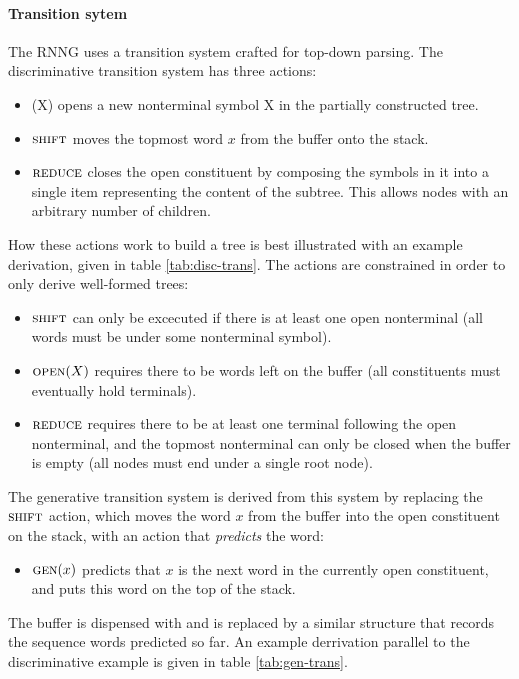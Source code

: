 \paragraph{Transition sytem}
The RNNG uses a transition system crafted for top-down parsing. The discriminative transition system has three actions:
\begin{itemize}
  \item \open(X) opens a new nonterminal symbol X in the partially constructed tree.
  \item $\textsc{shift}$ moves the topmost word $x$ from the buffer onto the stack.
  \item $\textsc{reduce}$ closes the open constituent by composing the symbols in it into a single item representing the content of the subtree. This allows nodes with an arbitrary number of children.
\end{itemize}
How these actions work to build a tree is best illustrated with an example derivation, given in table \ref{tab:disc-trans}. The actions are constrained in order to only derive well-formed trees:
\begin{itemize}
  \item $\textsc{shift}$ can only be excecuted if there is at least one open nonterminal (all words must be under some nonterminal symbol).
  \item $\textsc{open}(X)$ requires there to be words left on the buffer (all constituents must eventually hold terminals).
  \item $\textsc{reduce}$ requires there to be at least one terminal following the open nonterminal, and the topmost nonterminal can only be closed when the buffer is empty (all nodes must end under a single root node).
\end{itemize}
The generative transition system is derived from this system by replacing the $\textsc{shift}$ action, which moves the word $x$ from the buffer into the open constituent on the stack, with an action that \textit{predicts} the word:
\begin{itemize}
  \item $\textsc{gen}(x)$ predicts that $x$ is the next word in the currently open constituent, and puts this word on the top of the stack.
\end{itemize}
The buffer is dispensed with and is replaced by a similar structure that records the sequence words predicted so far. An example derrivation parallel to the discriminative example is given in table \ref{tab:gen-trans}.



